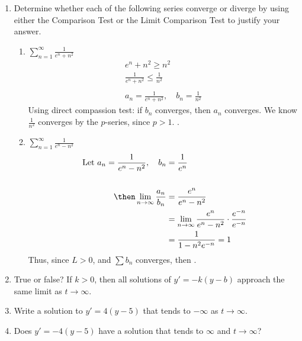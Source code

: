 \documentclass{nosvagor-notes}
\begin{document}
\begin{enumerate}
  \item Determine whether each of the following series converge or diverge by
    using either the Comparison Test or the Limit Comparison Test to justify
    your answer.
    \begin{enumerate}
      \item \(\displaystyle\sum_{n=1}^{\infty} \frac{1}{e^n + n^2}\)
        \begin{align*}
          e^n + n^2 \geq n^2 \\
          \frac{1}{e^n + n^2} \leq \frac{1}{n^2} \\\\
          a_n = \frac{1}{e^n + n^2}, \quad b_n = \frac{1}{n^2}
        \end{align*}
      Using direct compassion test: if \(b_n\) converges, then \(a_n\)
      converges. We know \(\frac{1}{n^2}\) converges by the \(p\)-series, since
      \(p > 1\). .
      \vspace{30pt}
      \item \(\displaystyle\sum_{n=1}^{\infty} \frac{1}{e^n - n^2}\)
      \begin{align*}
        ~\text{Let}~ a_n = \frac{1}{e^n - n^2}, \quad b_n &= \frac{1}{e^n} \\\\
        \then \lim_{n \to \infty} \frac{a_n}{b_n} &= \frac{e^n}{e^n-n^2}\\
           &= \lim_{n \to \infty} \frac{e^n}{e^n-n^2} \cdot \frac{e^{-n}}{e^{-n}} \\
           &= \frac{1}{1-n^2 e^{-n}} = 1
      \end{align*}
      Thus, since \(L > 0\), and \(\sum b_n\) converges, then .
    \end{enumerate}

  \newpage

  \item True or false? If \(k > 0\), then all solutions of \(y' = -k(y-b)\)
  approach the same limit as \(t \to \infty\).
  \vspace{60pt}

  \item Write a solution to \(y' = 4(y-5)\) that tends to \(-\infty\) as \(t\to
  \infty\).
  \vspace{90pt}

  \item Does \(y'=-4(y-5)\) have a solution that tends to \(\infty\) and \(t \to
  \infty\)?
  \vspace{90pt}


\end{enumerate}
\end{document}
